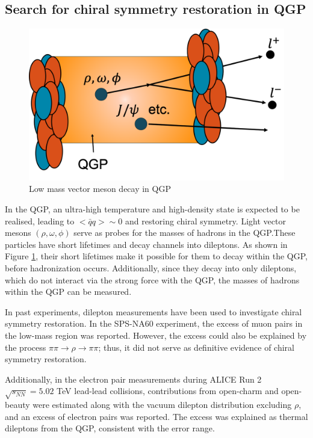     \subsection{Search for chiral symmetry restoration in QGP}
        \begin{figure}[hbtp]
            \centering
            \includegraphics[keepaspectratio, scale=0.2]{fig/1_7_Search_for_chiral.png}
            \caption{Low mass vector meson decay in QGP}
            \label{Intro:Search_for_CSR:Low_mass_vector_meson_decay_in_QGP}
        \end{figure}     
        In the QGP, an ultra-high temperature and high-density state is expected to be realised, leading to $ < \bar{q}q > \sim 0 $ and restoring chiral symmetry. Light vector mesons $(\rho, \omega, \phi)$ serve as probes for the masses of hadrons in the QGP.\@ These particles have short lifetimes and decay channels into dileptons. As shown in Figure \ref{Intro:Search_for_CSR:Low_mass_vector_meson_decay_in_QGP}, their short lifetimes make it possible for them to decay within the QGP, before hadronization occurs. Additionally, since they decay into only dileptons, which do not interact via the strong force with the QGP, the masses of hadrons within the QGP can be measured.  
        
        In past experiments, dilepton measurements have been used to investigate chiral symmetry restoration. In the SPS-NA60 experiment, the excess of muon pairs in the low-mass region was reported. However, the excess could also be explained by the process $\pi \pi \rightarrow \rho \rightarrow \pi \pi$; thus, it did not serve as definitive evidence of chiral symmetry restoration\cite{NA60}.  
        
        Additionally, in the electron pair measurements during ALICE Run 2 $\sqrt{s_{NN}} = 5.02$ TeV lead-lead collisions, contributions from open-charm and open-beauty were estimated along with the vacuum dilepton distribution excluding $\rho$, and an excess of electron pairs was reported. The excess was explained as thermal dileptons from the QGP, consistent with the error range\cite{ALICE:2023jef}. 
